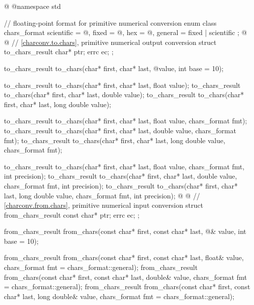 %
\begin{codeblock}
@%
%
%
%
%
%
@namespace std {
  // floating-point format for primitive numerical conversion
  enum class chars_format {
    scientific = @\unspec@,
    fixed = @\unspec@,
    hex = @\unspec@,
    general = fixed | scientific
  };
@%
%
%
@
  // \ref{charconv.to.chars}, primitive numerical output conversion
  struct to_chars_result {
    char* ptr;
    errc ec;
  };

  to_chars_result to_chars(char* first, char* last, @\seebelow@ value, int base = 10);

  to_chars_result to_chars(char* first, char* last, float value);
  to_chars_result to_chars(char* first, char* last, double value);
  to_chars_result to_chars(char* first, char* last, long double value);

  to_chars_result to_chars(char* first, char* last, float value, chars_format fmt);
  to_chars_result to_chars(char* first, char* last, double value, chars_format fmt);
  to_chars_result to_chars(char* first, char* last, long double value, chars_format fmt);

  to_chars_result to_chars(char* first, char* last, float value,
                           chars_format fmt, int precision);
  to_chars_result to_chars(char* first, char* last, double value,
                           chars_format fmt, int precision);
  to_chars_result to_chars(char* first, char* last, long double value,
                           chars_format fmt, int precision);
@%
%
%
@
  // \ref{charconv.from.chars}, primitive numerical input conversion
  struct from_chars_result {
    const char* ptr;
    errc ec;
  };

  from_chars_result from_chars(const char* first, const char* last,
                               @\seebelow@& value, int base = 10);

  from_chars_result from_chars(const char* first, const char* last, float& value,
                               chars_format fmt = chars_format::general);
  from_chars_result from_chars(const char* first, const char* last, double& value,
                               chars_format fmt = chars_format::general);
  from_chars_result from_chars(const char* first, const char* last, long double& value,
                               chars_format fmt = chars_format::general);
}
\end{codeblock}

